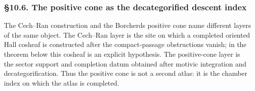 \subsubsection{\S 10.6. The positive cone as the decategorified descent index}
\label{gluing:sec:positive-cone-descent-index}

The Cech--Ran construction and the Borcherds positive cone name
different layers of the same object. The Cech--Ran layer is the site on
which a completed oriented Hall cosheaf is constructed after the
compact-passage obstructions vanish; in the theorem below this cosheaf
is an explicit hypothesis. The positive-cone layer is the sector
support and completion datum obtained after motivic integration and
decategorification. Thus the positive cone is not a second atlas: it is
the chamber index on which the atlas is completed.

